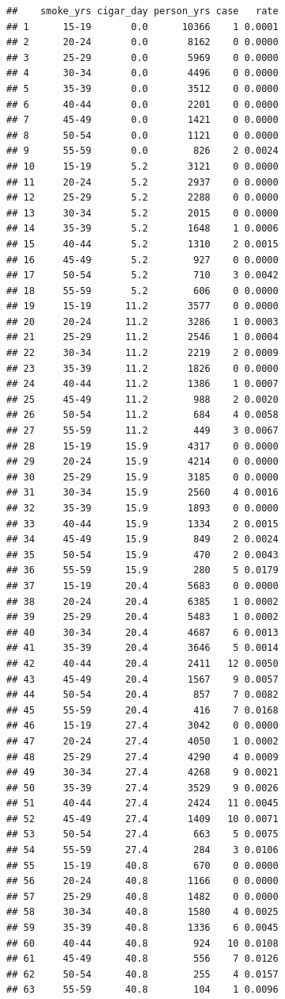 \documentclass[
  10pt,
]{krantz}
\begin{document}
\begin{verbatim}
##    smoke_yrs cigar_day person_yrs case   rate
## 1      15-19       0.0      10366    1 0.0001
## 2      20-24       0.0       8162    0 0.0000
## 3      25-29       0.0       5969    0 0.0000
## 4      30-34       0.0       4496    0 0.0000
## 5      35-39       0.0       3512    0 0.0000
## 6      40-44       0.0       2201    0 0.0000
## 7      45-49       0.0       1421    0 0.0000
## 8      50-54       0.0       1121    0 0.0000
## 9      55-59       0.0        826    2 0.0024
## 10     15-19       5.2       3121    0 0.0000
## 11     20-24       5.2       2937    0 0.0000
## 12     25-29       5.2       2288    0 0.0000
## 13     30-34       5.2       2015    0 0.0000
## 14     35-39       5.2       1648    1 0.0006
## 15     40-44       5.2       1310    2 0.0015
## 16     45-49       5.2        927    0 0.0000
## 17     50-54       5.2        710    3 0.0042
## 18     55-59       5.2        606    0 0.0000
## 19     15-19      11.2       3577    0 0.0000
## 20     20-24      11.2       3286    1 0.0003
## 21     25-29      11.2       2546    1 0.0004
## 22     30-34      11.2       2219    2 0.0009
## 23     35-39      11.2       1826    0 0.0000
## 24     40-44      11.2       1386    1 0.0007
## 25     45-49      11.2        988    2 0.0020
## 26     50-54      11.2        684    4 0.0058
## 27     55-59      11.2        449    3 0.0067
## 28     15-19      15.9       4317    0 0.0000
## 29     20-24      15.9       4214    0 0.0000
## 30     25-29      15.9       3185    0 0.0000
## 31     30-34      15.9       2560    4 0.0016
## 32     35-39      15.9       1893    0 0.0000
## 33     40-44      15.9       1334    2 0.0015
## 34     45-49      15.9        849    2 0.0024
## 35     50-54      15.9        470    2 0.0043
## 36     55-59      15.9        280    5 0.0179
## 37     15-19      20.4       5683    0 0.0000
## 38     20-24      20.4       6385    1 0.0002
## 39     25-29      20.4       5483    1 0.0002
## 40     30-34      20.4       4687    6 0.0013
## 41     35-39      20.4       3646    5 0.0014
## 42     40-44      20.4       2411   12 0.0050
## 43     45-49      20.4       1567    9 0.0057
## 44     50-54      20.4        857    7 0.0082
## 45     55-59      20.4        416    7 0.0168
## 46     15-19      27.4       3042    0 0.0000
## 47     20-24      27.4       4050    1 0.0002
## 48     25-29      27.4       4290    4 0.0009
## 49     30-34      27.4       4268    9 0.0021
## 50     35-39      27.4       3529    9 0.0026
## 51     40-44      27.4       2424   11 0.0045
## 52     45-49      27.4       1409   10 0.0071
## 53     50-54      27.4        663    5 0.0075
## 54     55-59      27.4        284    3 0.0106
## 55     15-19      40.8        670    0 0.0000
## 56     20-24      40.8       1166    0 0.0000
## 57     25-29      40.8       1482    0 0.0000
## 58     30-34      40.8       1580    4 0.0025
## 59     35-39      40.8       1336    6 0.0045
## 60     40-44      40.8        924   10 0.0108
## 61     45-49      40.8        556    7 0.0126
## 62     50-54      40.8        255    4 0.0157
## 63     55-59      40.8        104    1 0.0096
\end{verbatim}
\end{document}
